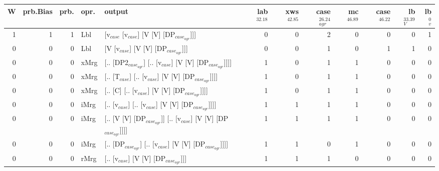 \begin{tabularx}{\linewidth}{rrrlXrrrrrrr}
\hline
   W &   prb.Bias &   prb. & opr.   & output                                                         &   lab$^{32.18}$ &   xws$^{42.85}$ &   case$_{agr}^{26.24}$ &   mc$^{46.89}$ &   case$^{46.22}$ &   lb$_{V}^{33.39}$ &   lb$_{v}^{0}$ \\
\hline
   1 &       1 &   1 & Lbl  & [v$_{case}$ [v$_{case}$] [V [V] [DP$_{case_{agr}}$]]]                        &             0 &             0 &                  2 &            0 &              0 &              0 &             1 \\
   0 &       0 &   0 & Lbl  & [V [v$_{case}$] [V [V] [DP$_{case_{agr}}$]]]                             &             0 &             0 &                  1 &            0 &              1 &              1 &             0 \\
   0 &       0 &   0 & xMrg & [.. [DP2$_{case_{agr}}$] [.. [v$_{case}$] [V [V] [DP$_{case_{agr}}$]]]]        &             1 &             0 &                  1 &            1 &              0 &              0 &             0 \\
   0 &       0 &   0 & xMrg & [.. [T$_{case}$] [.. [v$_{case}$] [V [V] [DP$_{case_{agr}}$]]]]              &             1 &             0 &                  1 &            1 &              0 &              0 &             0 \\
   0 &       0 &   0 & xMrg & [.. [C] [.. [v$_{case}$] [V [V] [DP$_{case_{agr}}$]]]]                   &             1 &             0 &                  1 &            1 &              0 &              0 &             0 \\
   0 &       0 &   0 & iMrg & [.. [v$_{case}$] [.. [v$_{case}$] [V [V] [DP$_{case_{agr}}$]]]]              &             1 &             1 &                  1 &            1 &              0 &              0 &             0 \\
   0 &       0 &   0 & iMrg & [.. [V [V] [DP$_{case_{agr}}$]] [.. [v$_{case}$] [V [V] [DP$_{case_{agr}}$]]]] &             1 &             1 &                  1 &            1 &              0 &              0 &             0 \\
   0 &       0 &   0 & iMrg & [.. [DP$_{case_{agr}}$] [.. [v$_{case}$] [V [V] [DP$_{case_{agr}}$]]]]         &             1 &             1 &                  0 &            1 &              0 &              0 &             0 \\
   0 &       0 &   0 & rMrg & [.. [v$_{case}$] [V [V] [DP$_{case_{agr}}$]]]                            &             1 &             1 &                  1 &            0 &              0 &              0 &             0 \\
\hline
\end{tabularx}\endgroup\\
